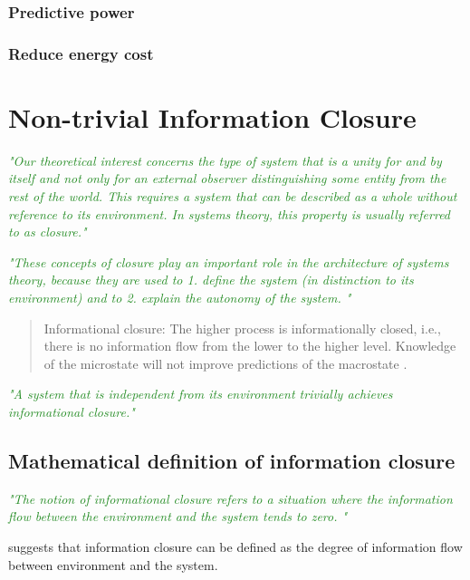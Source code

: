 \documentclass[utf8]{frontiersSCNS}
\newcommand{\rewrite}[1]{\textcolor{ForestGreen}{\textit{"#1"}}}
\begin{document}
		\subsubsection{Predictive power}
		\subsubsection{Reduce energy cost}	
	

\section{Non-trivial Information Closure}
	

	\rewrite{Our theoretical interest concerns the type of system that is a unity for and by itself and not only for an external observer distinguishing some entity from the rest of the world. This requires a system that can be described as a whole without reference to its environment. In systems theory, this property is usually referred to as closure.}\citep{BERTSCHINGER.2006}
	
	\rewrite{These concepts of closure play an important role in the architecture of systems theory, because they are used to
		1. define the system (in distinction to its environment) and to 
		2. explain the autonomy of the system.
	}

	\begin{quotation}
		Informational closure: The higher process is informationally closed, i.e., there is no information flow from the lower to the higher level. Knowledge of the microstate will not improve predictions of the macrostate \citep[p. 4]{PFANTE.2014}.
	\end{quotation}


	\rewrite{A system that is independent from its environment trivially achieves informational closure.}
	\citep{BERTSCHINGER.2006}



	\subsection{Mathematical definition of information closure}
		\rewrite{The notion of informational closure refers to a situation where the information flow between the environment and the system tends to zero.
		}
		
		
		\cite{BERTSCHINGER.2006} suggests that information closure can be defined as the degree of information flow between environment and the system. 
		
\end{document}

